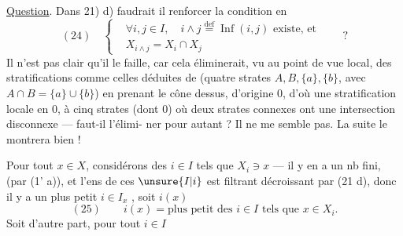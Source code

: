 \uline{Question}. Dans 21) d) faudrait il
renforcer la condition en
\[
(24)\quad\left\{\begin{aligned}
&\forall i,j\in I,\quad i\wedge j\overset{\mathrm{def}}{=}\operatorname{Inf}(i,j)\text{ existe, et}\\
&X_{i\wedge j}=X_i\cap X_j
\end{aligned}\right.\qquad ?
\]
Il n'est pas clair qu'il le faille, car
cela éliminerait, vu au point de vue local,
des stratifications comme celles déduites de 
(quatre strates $A,B,\{a\},\{b\}$, avec
$A\cap B=\{a\}\cup\{b\}$) en prenant le
cône dessus,  d'origine $0$,
d'où une stratification locale en $0$, à cinq
strates (dont $0$) où deux strates connexes ont
une intersection disconnexe --- faut-il l'élimi-
ner pour autant ? Il  ne me
semble pas. La suite le montrera bien !

Pour tout $x\in X$, considérons  des $i\in I$ tels
que $X_i\ni x$ --- il y en a un nb fini, 
(par (1' a)), et l'ens de ces $\unsure{I|i}$ est filtrant
décroissant par (21 d), donc il y a
un plus petit $i\in I_x$ , soit $i(x)$
\[
(25)\qquad i(x)=\text{plus petit des }i\in I\text{ tels que }x\in X_i.
\]
Soit d'autre part, pour tout $i\in I$
